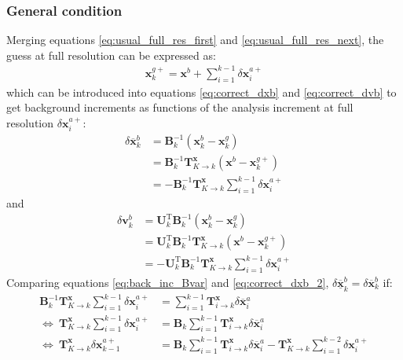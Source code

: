 \documentclass[12pt]{scrartcl}
\begin{document}
\subsubsection{General condition}
Merging equations \eqref{eq:usual_full_res_first} and \eqref{eq:usual_full_res_next}, the guess at full resolution can be expressed as:
\begin{align}
\label{eq:usual_full_res}
\mathbf{x}^{g+}_k = \mathbf{x}^{b} + \sum_{i=1}^{k-1} \delta \mathbf{x}^{a+}_i
\end{align}
which can be introduced into equations \eqref{eq:correct_dxb} and \eqref{eq:correct_dvb} to get background increments as functions of the analysis increment at full resolution $\delta \mathbf{x}^{a+}_i$:
\begin{align}
\label{eq:correct_dxb_2}
\delta \overline{\mathbf{x}}^b_k & = \mathbf{B}^{-1}_k \left(\mathbf{x}^b_k - \mathbf{x}^g_k\right) \nonumber \\
& = \mathbf{B}^{-1}_k \mathbf{T}^\mathbf{x}_{K \rightarrow k} \left(\mathbf{x}^b - \mathbf{x}^{g+}_k\right) \nonumber \\
& = -\mathbf{B}^{-1}_k \mathbf{T}^\mathbf{x}_{K \rightarrow k} \sum_{i=1}^{k-1} \delta \mathbf{x}^{a+}_i
\end{align}
and
\begin{align}
\label{eq:correct_dvb_2}
\delta \mathbf{v}^b_k & = \mathbf{U}_k^\mathrm{T} \mathbf{B}^{-1}_k \left(\mathbf{x}^b_k - \mathbf{x}^g_k\right) \nonumber \\
& = \mathbf{U}_k^\mathrm{T} \mathbf{B}^{-1}_k \mathbf{T}^\mathbf{x}_{K \rightarrow k} \left(\mathbf{x}^b - \mathbf{x}^{g+}_k\right) \nonumber \\
& = -\mathbf{U}_k^\mathrm{T} \mathbf{B}^{-1}_k \mathbf{T}^\mathbf{x}_{K \rightarrow k} \sum_{i=1}^{k-1} \delta \mathbf{x}^{a+}_i
\end{align}
$  $\\
Comparing equations \eqref{eq:back_inc_Bvar} and \eqref{eq:correct_dxb_2}, $\delta \underline{\overline{\mathbf{x}}}^b_k = \delta \overline{\mathbf{x}}^b_k$ if:
\begin{align}
\label{eq:general_condition_B}
\mathbf{B}^{-1}_k \mathbf{T}^\mathbf{x}_{K \rightarrow k} \sum_{i=1}^{k-1} \delta \mathbf{x}^{a+}_i & = \sum_{i=1}^{k-1} \mathbf{T}^\mathbf{x}_{i \rightarrow k} \delta \overline{\mathbf{x}}^a_i \nonumber \\
\Leftrightarrow \ \mathbf{T}^\mathbf{x}_{K \rightarrow k} \sum_{i=1}^{k-1} \delta \mathbf{x}^{a+}_i & = \mathbf{B}_k \sum_{i=1}^{k-1} \mathbf{T}^\mathbf{x}_{i \rightarrow k} \delta \overline{\mathbf{x}}^a_i \nonumber \\
\Leftrightarrow \ \mathbf{T}^\mathbf{x}_{K \rightarrow k} \delta \mathbf{x}^{a+}_{k-1} & =  \mathbf{B}_k \sum_{i=1}^{k-1} \mathbf{T}^\mathbf{x}_{i \rightarrow k} \delta \overline{\mathbf{x}}^a_i - \mathbf{T}^\mathbf{x}_{K \rightarrow k} \sum_{i=1}^{k-2} \delta \mathbf{x}^{a+}_i
\end{align}
\end{document}
